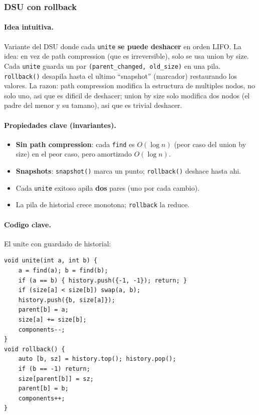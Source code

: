﻿\subsubsection{DSU con rollback}

\paragraph{Idea intuitiva.}
Variante del DSU donde cada \texttt{unite} \textbf{se puede deshacer} en orden LIFO. La idea: en vez de path compression (que es irreversible), solo se usa union by size. Cada \texttt{unite} guarda un par \texttt{(parent\_changed, old\_size)} en una pila. \texttt{rollback()} desapila hasta el ultimo ``snapshot'' (marcador) restaurando los valores. La razon: path compression modifica la estructura de multiples nodos, no solo uno, asi que es dificil de deshacer; union by size solo modifica dos nodos (el padre del menor y su tamano), asi que es trivial deshacer.

\paragraph{Propiedades clave (invariantes).}
\begin{itemize}\setlength\itemsep{0pt}
	\item \textbf{Sin path compression}: cada \texttt{find} es $O(\log n)$ (peor caso del union by size) en el peor caso, pero amortizado $O(\log n)$.
	\item \textbf{Snapshots}: \texttt{snapshot()} marca un punto; \texttt{rollback()} deshace hasta ahi.
	\item Cada \texttt{unite} exitoso apila \textbf{dos} pares (uno por cada cambio).
	\item La pila de historial crece monotona; \texttt{rollback} la reduce.
\end{itemize}

\paragraph{Codigo clave.}
El unite con guardado de historial:
\begin{verbatim}
void unite(int a, int b) {
    a = find(a); b = find(b);
    if (a == b) { history.push({-1, -1}); return; }
    if (size[a] < size[b]) swap(a, b);
    history.push({b, size[a]});
    parent[b] = a;
    size[a] += size[b];
    components--;
}
void rollback() {
    auto [b, sz] = history.top(); history.pop();
    if (b == -1) return;
    size[parent[b]] = sz;
    parent[b] = b;
    components++;
}
\end{verbatim}

